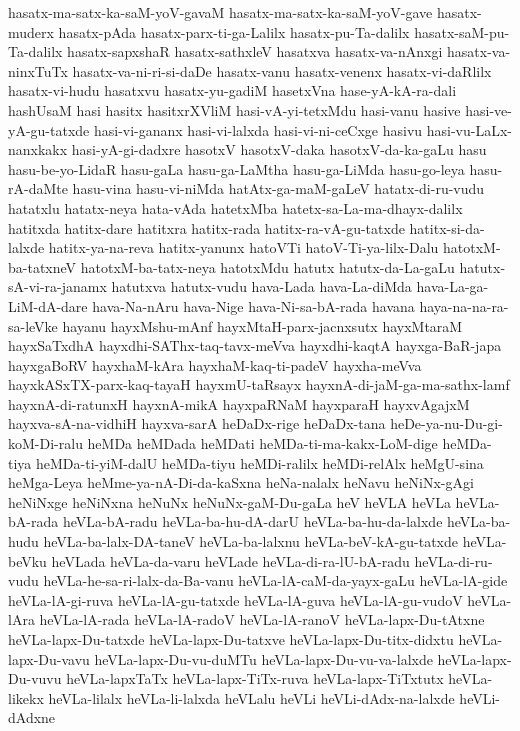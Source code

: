 {hasatx-ma-satx-ka-saM-yoV-gavaM
hasatx-ma-satx-ka-saM-yoV-gave
hasatx-muderx
hasatx-pAda
hasatx-parx-ti-ga-Lalilx
hasatx-pu-Ta-dalilx
hasatx-saM-pu-Ta-dalilx
hasatx-sapxshaR
hasatx-sathxleV
hasatxva
hasatx-va-nAnxgi
hasatx-va-ninxTuTx
hasatx-va-ni-ri-si-daDe
hasatx-vanu
hasatx-venenx
hasatx-vi-daRlilx
hasatx-vi-hudu
hasatxvu
hasatx-yu-gadiM
hasetxVna
hase-yA-kA-ra-dali
hashUsaM
hasi
hasitx
hasitxrXVliM
hasi-vA-yi-tetxMdu
hasi-vanu
hasive
hasi-ve-yA-gu-tatxde
hasi-vi-gananx
hasi-vi-lalxda
hasi-vi-ni-ceCxge
hasivu
hasi-vu-LaLx-nanxkakx
hasi-yA-gi-dadxre
hasotxV
hasotxV-daka
hasotxV-da-ka-gaLu
hasu
hasu-be-yo-LidaR
hasu-gaLa
hasu-ga-LaMtha
hasu-ga-LiMda
hasu-go-leya
hasu-rA-daMte
hasu-vina
hasu-vi-niMda
hatAtx-ga-maM-gaLeV
hatatx-di-ru-vudu
hatatxlu
hatatx-neya
hata-vAda
hatetxMba
hatetx-sa-La-ma-dhayx-dalilx
hatitxda
hatitx-dare
hatitxra
hatitx-rada
hatitx-ra-vA-gu-tatxde
hatitx-si-da-lalxde
hatitx-ya-na-reva
hatitx-yanunx
hatoVTi
hatoV-Ti-ya-lilx-Dalu
hatotxM-ba-tatxneV
hatotxM-ba-tatx-neya
hatotxMdu
hatutx
hatutx-da-La-gaLu
hatutx-sA-vi-ra-janamx
hatutxva
hatutx-vudu
hava-Lada
hava-La-diMda
hava-La-ga-LiM-dA-dare
hava-Na-nAru
hava-Nige
hava-Ni-sa-bA-rada
havana
haya-na-na-ra-sa-leVke
hayanu
hayxMshu-mAnf
hayxMtaH-parx-jacnxsutx
hayxMtaraM
hayxSaTxdhA
hayxdhi-SAThx-taq-tavx-meVva
hayxdhi-kaqtA
hayxga-BaR-japa
hayxgaBoRV
hayxhaM-kAra
hayxhaM-kaq-ti-padeV
hayxha-meVva
hayxkASxTX-parx-kaq-tayaH
hayxmU-taRsayx
hayxnA-di-jaM-ga-ma-sathx-lamf
hayxnA-di-ratunxH
hayxnA-mikA
hayxpaRNaM
hayxparaH
hayxvAgajxM
hayxva-sA-na-vidhiH
hayxva-sarA
heDaDx-rige
heDaDx-tana
heDe-ya-nu-Du-gi-koM-Di-ralu
heMDa
heMDada
heMDati
heMDa-ti-ma-kakx-LoM-dige
heMDa-tiya
heMDa-ti-yiM-dalU
heMDa-tiyu
heMDi-ralilx
heMDi-relAlx
heMgU-sina
heMga-Leya
heMme-ya-nA-Di-da-kaSxna
heNa-nalalx
heNavu
heNiNx-gAgi
heNiNxge
heNiNxna
heNuNx
heNuNx-gaM-Du-gaLa
heV
heVLA
heVLa
heVLa-bA-rada
heVLa-bA-radu
heVLa-ba-hu-dA-darU
heVLa-ba-hu-da-lalxde
heVLa-ba-hudu
heVLa-ba-lalx-DA-taneV
heVLa-ba-lalxnu
heVLa-beV-kA-gu-tatxde
heVLa-beVku
heVLada
heVLa-da-varu
heVLade
heVLa-di-ra-lU-bA-radu
heVLa-di-ru-vudu
heVLa-he-sa-ri-lalx-da-Ba-vanu
heVLa-lA-caM-da-yayx-gaLu
heVLa-lA-gide
heVLa-lA-gi-ruva
heVLa-lA-gu-tatxde
heVLa-lA-guva
heVLa-lA-gu-vudoV
heVLa-lAra
heVLa-lA-rada
heVLa-lA-radoV
heVLa-lA-ranoV
heVLa-lapx-Du-tAtxne
heVLa-lapx-Du-tatxde
heVLa-lapx-Du-tatxve
heVLa-lapx-Du-titx-didxtu
heVLa-lapx-Du-vavu
heVLa-lapx-Du-vu-duMTu
heVLa-lapx-Du-vu-va-lalxde
heVLa-lapx-Du-vuvu
heVLa-lapxTaTx
heVLa-lapx-TiTx-ruva
heVLa-lapx-TiTxtutx
heVLa-likekx
heVLa-lilalx
heVLa-li-lalxda
heVLalu
heVLi
heVLi-dAdx-na-lalxde
heVLi-dAdxne
}
